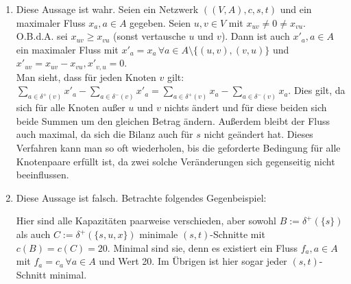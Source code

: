 \documentclass[a4paper,12pt,german]{scrartcl}
\begin{document}
\begin{enumerate}
  \item Diese Aussage ist wahr. Seien ein Netzwerk $((V,A),c,s,t)$ und ein maximaler Fluss $x_a,a\in A$ gegeben. Seien $u,v\in V$ mit $x_{uv}\neq0\neq x_{vu}$. O.B.d.A. sei $x_{uv}\geq x_{vu}$ (sonst vertausche $u$ und $v$). Dann ist auch $x'_{a},a\in A$ ein maximaler Fluss mit $x'_a=x_a\,\forall a\in A\setminus\{(u,v),(v,u)\}$ und $x'_{uv}=x_{uv}-x_{vu},x'_{v,u}=0$.\\
  Man sieht, dass für jeden Knoten $v$ gilt: $\sum\limits_{a\in\delta^+(v)}x'_a-\sum\limits_{a\in\delta^-(v)}x'_a=\sum\limits_{a\in\delta^+(v)}x_a-\sum\limits_{a\in\delta^-(v)}x_a$. Dies gilt, da sich für alle Knoten außer $u$ und $v$ nichts ändert und für diese beiden sich beide Summen um den gleichen Betrag ändern. Außerdem bleibt der Fluss auch maximal, da sich die Bilanz auch für $s$ nicht geändert hat. Dieses Verfahren kann man so oft wiederholen, bis die geforderte Bedingung für alle Knotenpaare erfüllt ist, da zwei solche Veränderungen sich gegenseitig nicht beeinflussen.
  \item Diese Aussage ist falsch. Betrachte folgendes Gegenbeispiel:
    \begin{center}
    \end{center}
    Hier sind alle Kapazitäten paarweise verschieden, aber sowohl $B:=\delta^+(\{s\})$ als auch $C:=\delta^+(\{s,u,x\})$ minimale $(s,t)$-Schnitte mit $c(B)=c(C)=20$. Minimal sind sie, denn es existiert ein Fluss $f_a,a\in A$ mit $f_a=c_a\,\forall a\in A$ und Wert 20. Im Übrigen ist hier sogar jeder $(s,t)$-Schnitt minimal.
    

\end{enumerate}
\end{document}
